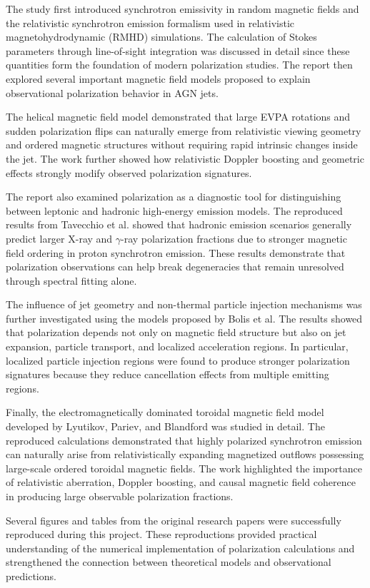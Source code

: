 \documentclass{article}
\begin{document}
The study first introduced synchrotron emissivity in random magnetic fields and the relativistic synchrotron emission formalism used in relativistic magnetohydrodynamic (RMHD) simulations. The calculation of Stokes parameters through line-of-sight integration was discussed in detail since these quantities form the foundation of modern polarization studies. The report then explored several important magnetic field models proposed to explain observational polarization behavior in AGN jets.

The helical magnetic field model demonstrated that large EVPA rotations and sudden polarization flips can naturally emerge from relativistic viewing geometry and ordered magnetic structures without requiring rapid intrinsic changes inside the jet. The work further showed how relativistic Doppler boosting and geometric effects strongly modify observed polarization signatures.

The report also examined polarization as a diagnostic tool for distinguishing between leptonic and hadronic high-energy emission models. The reproduced results from Tavecchio et al. showed that hadronic emission scenarios generally predict larger X-ray and \(\gamma\)-ray polarization fractions due to stronger magnetic field ordering in proton synchrotron emission. These results demonstrate that polarization observations can help break degeneracies that remain unresolved through spectral fitting alone.

The influence of jet geometry and non-thermal particle injection mechanisms was further investigated using the models proposed by Bolis et al. The results showed that polarization depends not only on magnetic field structure but also on jet expansion, particle transport, and localized acceleration regions. In particular, localized particle injection regions were found to produce stronger polarization signatures because they reduce cancellation effects from multiple emitting regions.

Finally, the electromagnetically dominated toroidal magnetic field model developed by Lyutikov, Pariev, and Blandford was studied in detail. The reproduced calculations demonstrated that highly polarized synchrotron emission can naturally arise from relativistically expanding magnetized outflows possessing large-scale ordered toroidal magnetic fields. The work highlighted the importance of relativistic aberration, Doppler boosting, and causal magnetic field coherence in producing large observable polarization fractions.

Several figures and tables from the original research papers were successfully reproduced during this project. These reproductions provided practical understanding of the numerical implementation of polarization calculations and strengthened the connection between theoretical models and observational predictions.
\end{document}
